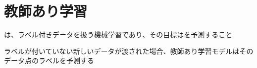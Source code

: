 \documentclass[../../../topic_machine-learning]{subfiles}
\begin{document}
\sectionline
\section{教師あり学習}

は、ラベル付きデータを扱う機械学習であり、その目標はを予測すること

ラベルが付いていない新しいデータが渡された場合、教師あり学習モデルはそのデータ点のラベルを予測する
\end{document}
